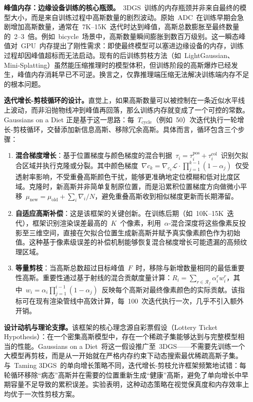 \textbf{峰值内存：边缘设备训练的核心瓶颈。}~3DGS~训练的内存瓶颈并非来自最终的模型大小，而是来自训练过程中高斯数量的剧烈波动。原始~ADC~在训练早期会急剧增加高斯数量，通常在~7K--15K~迭代时达到峰值，高斯总数膨胀至最终数量的~2--3~倍。例如~bicycle~场景中，高斯数量瞬间膨胀到数百万级别。这一瞬态峰值对~GPU~内存提出了刚性需求：即使最终模型可以塞进边缘设备的内存，训练过程却因峰值超标而无法启动。现有的后训练剪枝方法（如~LightGaussian、Mini-Splatting）虽然能压缩推理时的模型体积，但训练阶段的高斯爆炸已经发生，峰值内存消耗早已不可逆。换言之，仅靠推理端压缩无法解决训练端内存不足的根本问题。

\textbf{迭代增长-剪枝循环的设计。}直觉上，如果高斯数量可以被控制在一条近似水平线上波动，而非沿抛物线冲到峰值再回落，那么训练内存就变成了一个可控的常数。Gaussians on a Diet 正是基于这一思路：每~$T_{\text{cycle}}$（例如~50）次迭代执行一轮增长-剪枝循环，交替添加新信息高斯、移除冗余高斯。具体而言，循环包含三个步骤：

\begin{enumerate}
    \item \textbf{混合梯度增长}：基于位置梯度与颜色梯度的混合判据~$\tau_i = \tau_i^{\text{pos}} + \tau_i^{\text{col}}$~识别欠拟合区域并执行克隆或分裂。其中颜色梯度~$\nabla c_k = \nabla_{c_k}\mathcal{L} \cdot \prod_{j=1}^{k-1}(1-\alpha_j)$~仅受透射率影响，不受重叠高斯颜色干扰，能够更准确地定位模糊和低对比度区域。克隆时，新高斯并非简单复制原位置，而是沿累积位置梯度方向做微小平移~$\mu_{\text{new}} = \mu_{\text{old}} + \sum_i \nabla_i / N$，避免重叠高斯收到相似梯度更新而长期滞留。
    \item \textbf{自适应高斯补偿}：这是该框架的关键创新。在训练后期（如~10K--15K~迭代），框架识别渲染误差最高的~$K$~个像素，利用~$\alpha$-混合深度将这些像素反投影至三维空间，直接在欠拟合位置生成新高斯并赋予真实像素颜色作为初始值。这种基于像素级误差的补偿机制能够恢复混合梯度增长可能遗漏的高频纹理区域。
    \item \textbf{等量剪枝}：当高斯总数超过目标峰值~$F$~时，移除与新增数量相同的最低重要性高斯。重要性通过基于射线的混合贡献度量计算：$R_i = \sum_{r \in \mathcal{R}_f} \alpha_i^r w_i^r$，其中~$w_i = \alpha_i \prod_{j=1}^{i-1}(1-\alpha_j)$~反映每个高斯对最终像素颜色的实际贡献。该指标可在现有渲染管线中高效计算，每~100~次迭代执行一次，几乎不引入额外开销。
\end{enumerate}

\textbf{设计动机与理论支撑。}该框架的核心理念源自彩票假设（Lottery Ticket Hypothesis）：在一个密集高斯模型中，存在一个稀疏子集能够达到与完整模型相当的性能。Gaussians on a Diet~将这一假设推广至~3DGS——不需要先训练一个大模型再剪枝，而是从一开始就在严格内存约束下动态搜索最优稀疏高斯子集。与~Taming 3DGS~的单向增长策略不同，迭代增长-剪枝允许框架频繁地试错：每轮循环移除``病态''高斯并在需要的位置重新生成``健康''高斯，避免了单向增长中早期容量不足导致的累积误差。实验表明，这种动态策略在视觉保真度和内存效率上均优于一次性剪枝方案。

